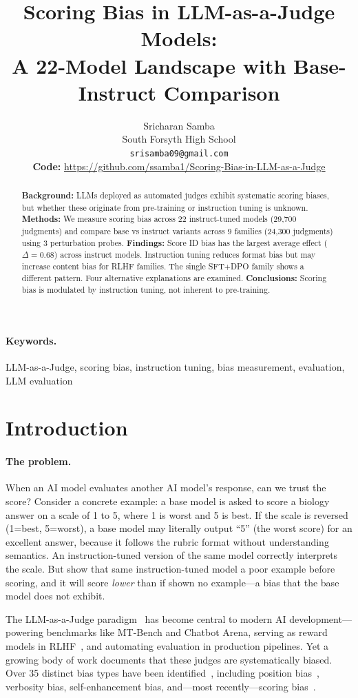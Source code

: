 \documentclass[11pt,preprint,nonatbib]{article}
\title{Scoring Bias in LLM-as-a-Judge Models:\\
A 22-Model Landscape with Base-Instruct Comparison}
\author{%
  Sricharan Samba \\
  South Forsyth High School \\
  \texttt{srisamba09@gmail.com} \\
  \And
  \textbf{Code:} \url{https://github.com/ssamba1/Scoring-Bias-in-LLM-as-a-Judge}
}
\begin{document}
\maketitle

\begin{abstract}
\textbf{Background:} LLMs deployed as automated judges exhibit systematic scoring biases, but whether these originate from pre-training or instruction tuning is unknown. \textbf{Methods:} We measure scoring bias across 22 instruct-tuned models (29,700 judgments) and compare base vs instruct variants across 9 families (24,300 judgments) using 3 perturbation probes. \textbf{Findings:} Score ID bias has the largest average effect ($\Delta=0.68$) across instruct models. Instruction tuning reduces format bias but may increase content bias for RLHF families. The single SFT+DPO family shows a different pattern. Four alternative explanations are examined. \textbf{Conclusions:} Scoring bias is modulated by instruction tuning, not inherent to pre-training.
\end{abstract}

\paragraph{Keywords.} LLM-as-a-Judge, scoring bias, instruction tuning, bias measurement, evaluation, LLM evaluation

\section{Introduction}

\paragraph{The problem.}
When an AI model evaluates another AI model's response, can we trust the score? Consider a concrete example: a base model is asked to score a biology answer on a scale of 1 to 5, where 1 is worst and 5 is best. If the scale is reversed (1=best, 5=worst), a base model may literally output ``5'' (the worst score) for an excellent answer, because it follows the rubric format without understanding semantics. An instruction-tuned version of the same model correctly interprets the scale. But show that same instruction-tuned model a poor example before scoring, and it will score \emph{lower} than if shown no example---a bias that the base model does not exhibit.

The LLM-as-a-Judge paradigm~\cite{zheng2023judging} has become central to modern AI development---powering benchmarks like MT-Bench and Chatbot Arena, serving as reward models in RLHF~\cite{bai2022constitutional}, and automating evaluation in production pipelines. Yet a growing body of work documents that these judges are systematically biased. Over 35 distinct bias types have been identified~\cite{ye2024justice,gu2024survey}, including position bias~\cite{wang2023large}, verbosity bias, self-enhancement bias, and---most recently---scoring bias~\cite{li2025scoring}.
\end{document}
